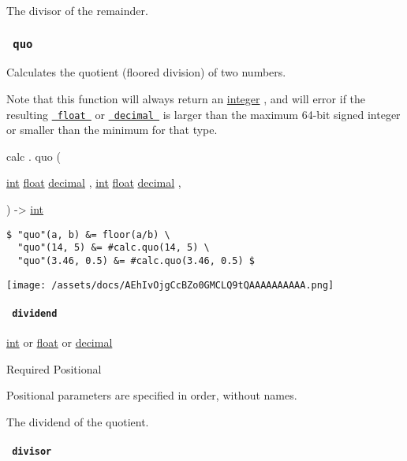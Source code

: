 The divisor of the remainder.

\subsubsection{\texorpdfstring{\texttt{\ quo\ }}{ quo }}\label{functions-quo}

Calculates the quotient (floored division) of two numbers.

Note that this function will always return an
\href{/docs/reference/foundations/int/}{integer} , and will error if the
resulting \href{/docs/reference/foundations/float/}{\texttt{\ float\ }}
or \href{/docs/reference/foundations/decimal/}{\texttt{\ decimal\ }} is
larger than the maximum 64-bit signed integer or smaller than the
minimum for that type.

calc { . } { quo } (

{ \href{/docs/reference/foundations/int/}{int}
\href{/docs/reference/foundations/float/}{float}
\href{/docs/reference/foundations/decimal/}{decimal} , } {
\href{/docs/reference/foundations/int/}{int}
\href{/docs/reference/foundations/float/}{float}
\href{/docs/reference/foundations/decimal/}{decimal} , }

) -\textgreater{} \href{/docs/reference/foundations/int/}{int}

\begin{verbatim}
$ "quo"(a, b) &= floor(a/b) \
  "quo"(14, 5) &= #calc.quo(14, 5) \
  "quo"(3.46, 0.5) &= #calc.quo(3.46, 0.5) $
\end{verbatim}

\texttt{[image: /assets/docs/AEhIvOjgCcBZo0GMCLQ9tQAAAAAAAAAA.png]}

\paragraph{\texorpdfstring{\texttt{\ dividend\ }}{ dividend }}\label{functions-quo-dividend}

\href{/docs/reference/foundations/int/}{int} {or}
\href{/docs/reference/foundations/float/}{float} {or}
\href{/docs/reference/foundations/decimal/}{decimal}

{Required} {{ Positional }}

\label{functions-quo-dividend-positional-tooltip}
Positional parameters are specified in order, without names.

The dividend of the quotient.

\paragraph{\texorpdfstring{\texttt{\ divisor\ }}{ divisor }}\label{functions-quo-divisor}

